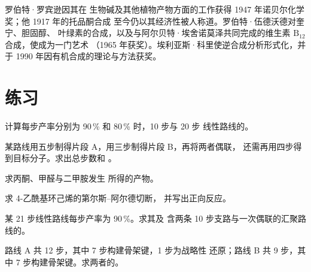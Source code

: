 \begin{history}
罗伯特·罗宾逊因其在
生物碱及其他植物产物方面的工作获得 1947 年诺贝尔化学奖；他 1917 年的托品酮合成
至今仍以其经济性被人称道。罗伯特·伍德沃德对奎宁、胆固醇、
叶绿素的合成，以及与阿尔贝特·埃舍诺莫泽共同完成的维生素 $\mathrm B_{12}$ 合成，使成为一门艺术
（1965 年获奖）。埃利亚斯·科里使逆合成分析形式化，并于
1990 年因有机合成的理论与方法获奖。
\end{history}

\section{练习}

\begin{exercise}[$\star$]\label{exo:b3:total-synthesis:1}
计算每步产率分别为 90\,\% 和 80\,\% 时，10 步与 20 步
线性路线的。
\end{exercise}

\begin{exercise}[$\star$]\label{exo:b3:total-synthesis:2}
某路线用五步制得片段 A，用三步制得片段 B，再将两者偶联，
还需再用四步得到目标分子。求出总步数和
。
\end{exercise}

\begin{exercise}[$\star$]\label{exo:b3:total-synthesis:3}
求丙酮、甲醛与二甲胺发生
所得的产物。
\end{exercise}

\begin{exercise}[$\star$]\label{exo:b3:total-synthesis:4}
求 4-乙酰基环己烯的第尔斯–阿尔德切断，
并写出正向反应。
\end{exercise}

\begin{exercise}[$\star\star$]\label{exo:b3:total-synthesis:5}
某 21 步线性路线每步产率为 90\,\%。求其及
含两条 10 步支路与一次偶联的汇聚路线的。
\end{exercise}

\begin{exercise}[$\star\star$]\label{exo:b3:total-synthesis:6}
路线 A 共 12 步，其中 7 步构建骨架键，1 步为战略性
还原；路线 B 共 9 步，其中 7 步构建骨架键。求两者的。
\end{exercise}

